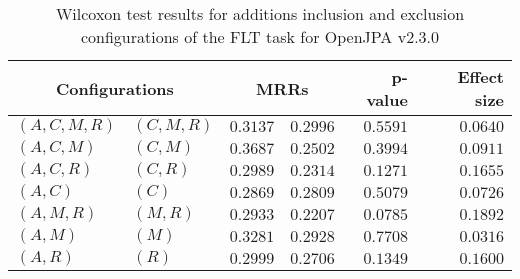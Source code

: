 
\begin{table}
\begin{spacing}{1.2}
\centering
\caption{Wilcoxon test results for additions inclusion and exclusion configurations of the FLT task for OpenJPA v2.3.0}
\label{table:versus-wilcox-openjpa-flt-additions}
\begin{tabular}{ll|rr|rr}
\toprule
      \multicolumn{2}{c|}{Configurations} &          \multicolumn{2}{c|}{MRRs} &       p-value & Effect size \\
\midrule
 $(A,C,M,R)$ &  $(C,M,R)$ & $0.3137$ & $0.2996$ & $0.5591$ &    $0.0640$ \\
   $(A,C,M)$ &    $(C,M)$ & $0.3687$ & $0.2502$ & $0.3994$ &    $0.0911$ \\
   $(A,C,R)$ &    $(C,R)$ & $0.2989$ & $0.2314$ & $0.1271$ &    $0.1655$ \\
     $(A,C)$ &      $(C)$ & $0.2869$ & $0.2809$ & $0.5079$ &    $0.0726$ \\
   $(A,M,R)$ &    $(M,R)$ & $0.2933$ & $0.2207$ & $0.0785$ &    $0.1892$ \\
     $(A,M)$ &      $(M)$ & $0.3281$ & $0.2928$ & $0.7708$ &    $0.0316$ \\
     $(A,R)$ &      $(R)$ & $0.2999$ & $0.2706$ & $0.1349$ &    $0.1600$ \\
\bottomrule
\end{tabular}

\end{spacing}
\end{table}

